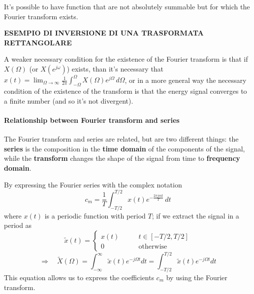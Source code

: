 	It's possible to have function that are not absolutely summable but for which the Fourier transform exists.
	
	\textbf{ESEMPIO DI INVERSIONE DI UNA TRASFORMATA RETTANGOLARE}
	
	A weaker necessary condition for the existence of the Fourier transform is that if $X(\Omega)$ (or $X(e^{j\omega})$) exists, than it's necessary that $x(t) = \lim_{\Omega \rightarrow \infty} \frac 1 {2\pi} \int_{-\Omega}^\Omega X(\Omega) e^{j\Omega} \, d\Omega $, or in a more general way the necessary condition of the existence of the transform is that the energy signal converges to a finite number (and so it's not divergent).
	
	\paragraph{Relationship between Fourier transform and series} 
	The Fourier transform and series are related, but are two different things: the \textbf{series} is the composition in the \textbf{time domain} of the components of the signal, while the \textbf{transform} changes the shape of the signal from time to \textbf{frequency domain}.
	
	By expressing the Fourier series with the complex notation
	\[ c_m = \frac 1 T \int_{-T/2}^{T/2} x(t) e^{-\frac{2\pi j m t}{T} } \, dt \]
	where $x(t)$ is a periodic function with period $T$; if we extract the signal in a period as
	\[\tilde x(t) = \begin{cases}
		x(t) \qquad & t \in [-T/2,T/2] \\ 0 & \textrm{otherwise}
	\end{cases} \]
	\[ \Rightarrow \quad \tilde X(\Omega) = \int_{-\infty}^{\infty} \tilde x(t) e^{-j\Omega t} dt = \int_{-T/2}^{T/2} \tilde x(t) e^{-j\Omega t} dt \]
	This equation allows us to express the coefficients $c_m$ by using the Fourier transform.
	
	
